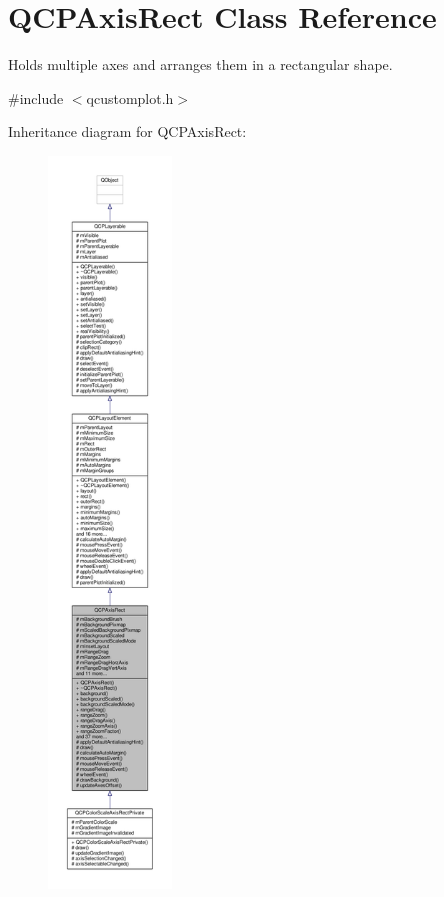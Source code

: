 \hypertarget{class_q_c_p_axis_rect}{}\section{Q\+C\+P\+Axis\+Rect Class Reference}
\label{class_q_c_p_axis_rect}


Holds multiple axes and arranges them in a rectangular shape.  




{\ttfamily \#include $<$qcustomplot.\+h$>$}



Inheritance diagram for Q\+C\+P\+Axis\+Rect\+:\nopagebreak
\begin{figure}[H]
\begin{center}
\leavevmode
\includegraphics[height=550pt]{class_q_c_p_axis_rect__inherit__graph}
\end{center}
\end{figure}


